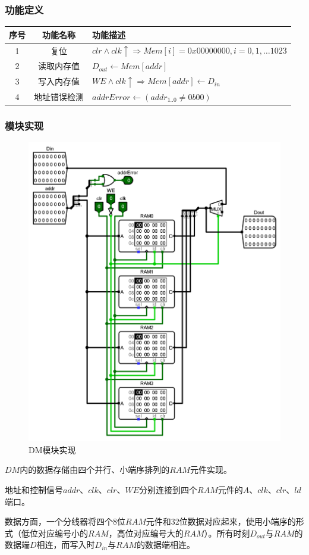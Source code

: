\documentclass[main.tex]{subfiles}
\begin{document}
\subsubsection{功能定义}
\begin{center}
    \begin{tabular}{c c l}
        \toprule
        序号 & 功能名称 & 功能描述 \\
        \midrule
        1 & 复位 & $clr \land clk\uparrow \Rightarrow  Mem[i] = 0x00000000, i=0, 1, \dots 1023 $ \\
        2 & 读取内存值 & $ D_{out} \leftarrow Mem[addr] $ \\
        3 & 写入内存值 & $ WE \land clk\uparrow \Rightarrow Mem[addr] \leftarrow D_{in}$ \\
        4 & 地址错误检测 & $addrError \leftarrow \left( addr_{1..0} \neq 0b00 \right)$ \\
        \bottomrule
    \end{tabular}
\end{center}

\subsubsection{模块实现}
\begin{figure}[h]
\centering
\includegraphics[width=\textwidth]{images/DM-circuit.png}
\caption{DM模块实现}
\end{figure}
$DM$内的数据存储由四个并行、小端序排列的$RAM$元件实现。

地址和控制信号$addr$、$clk$、$clr$、$WE$分别连接到四个$RAM$元件的$A$、$clk$、$clr$、$ld$端口。

数据方面，一个分线器将四个8位$RAM$元件和32位数据对应起来，使用小端序的形式（低位对应编号小的$RAM$，高位对应编号大的$RAM$）。所有时刻$D_{out}$与$RAM$的数据端$D$相连，而写入时$D_{in}$与$RAM$的数据端相连。
\end{document}
